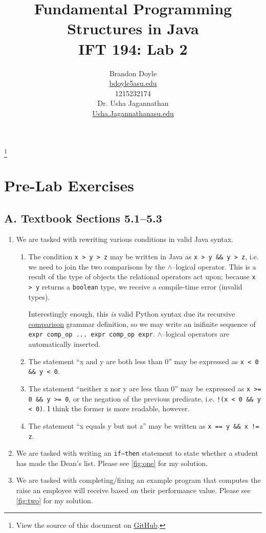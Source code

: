 \documentclass[leqno, 11pt]{article}
\title{\vspace{6ex}Fundamental Programming Structures in Java\\
  \Large IFT 194: Lab 2}
\author{Brandon Doyle\\
\href{mailto:bdoyle@asu.edu}{bdoyle5\at{}asu.edu}\\
1215232174\\[1em]
Dr. Usha Jagannathan\\
\href{mailto:Usha.Jagannathan@asu.edu}{Usha.Jagannathan\at{}asu.edu}}
\newcommand\blfootnote[1]{%
  \begingroup
    \renewcommand\thefootnote{}\footnote{#1}
    \addtocounter{footnote}{-1}
  \endgroup
}
\begin{document}
\begin{titlepage}
\clearpage\maketitle
\thispagestyle{empty}
\end{titlepage}
\blfootnote{View the source of this document on \href{https://github.com/bjd2385/IFT_194_labs/blob/master/\jobname.tex}{GitHub}.}
\section*{Pre-Lab Exercises}
\subsection*{A. Textbook Sections 5.1--5.3}
\begin{enumerate}
  \item We are tasked with rewriting various conditions in valid Java syntax. 
        \begin{enumerate}
          \item The condition \texttt{x > y > z} may be written in Java as \texttt{x > y \&\& y > z}, i.e. we need to join the two comparisons by the $\wedge$--logical operator. This is a result of the type of objects the relational operators act upon; because \texttt{x > y} returns a \texttt{boolean} type, we receive a compile-time error (invalid types).
    
                Interestingly enough, this \textit{is} valid Python syntax due its recursive \href{https://github.com/python/cpython/blob/master/Grammar/Grammar#L93}{comparison} grammar definition, so we may write an inifinite sequence of \texttt{expr comp\_op ... expr comp\_op expr}. $\wedge$--logical operators are automatically inserted.
              \item The statement ``x and y are both less than 0'' may be expressed as \texttt{x < 0 \&\& y < 0}.
              \item The statement ``neither x nor y are less than 0'' may be expressed as \texttt{x >= 0 \&\& y >= 0}, or the negation of the previous predicate, i.e. \texttt{!(x < 0 \&\& y < 0)}. I think the former is more readable, however.
              \item The statement ``x equals y but not z'' may be written as \texttt{x == y \&\& x != z}.
        \end{enumerate}
  \item We are tasked with writing an \texttt{if--then} statement to state whether a student has made the Dean's list. Please see \autoref{fig:one} for my solution.
  \item We are tasked with completing/fixing an example program that computes the raise an employee will receive based on their performance value. Please see \autoref{fig:two} for my solution.
\end{enumerate}
\end{document}
